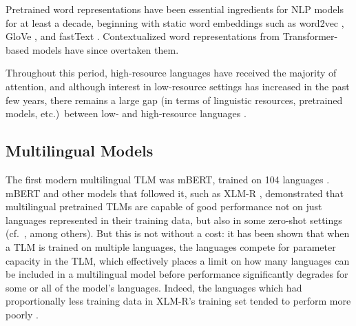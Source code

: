 \documentclass[11pt]{article}
\begin{document}
Pretrained word representations have been essential ingredients for NLP models for at least a decade, beginning with static word embeddings such as word2vec \citep{mikolov_distributed_2013,mikolov_efficient_2013}, GloVe \citep{pennington_glove_2014}, and fastText \citep{bojanowski_enriching_2017}.
Contextualized word representations \citep{mccann_learned_2018,peters_deep_2018,devlin_bert_2019} from Transformer-based \citep{vaswani_attention_2017} models have since overtaken them.


Throughout this period, high-resource languages have received the majority of attention, and although interest in low-resource settings has increased in the past few years, there remains a large gap (in terms of linguistic resources, pretrained models, etc.)\ between low- and high-resource languages \citep{joshi-etal-2020-state}.

\subsection{Multilingual Models} 
The first modern multilingual TLM was mBERT, trained on 104 languages \citep{devlin_bert_2019}.
mBERT and other models that followed it, such as XLM-R \citep{conneau_unsupervised_2020}, demonstrated that multilingual pretrained TLMs are capable of good performance not on just languages represented in their training data, but also in some zero-shot settings (cf.~\citealt{pires_how_2019,rogers_primer_2020-3}, among others).
But this is not without a cost: it has been shown \citep{conneau_unsupervised_2020} that when a TLM is trained on multiple languages, the languages compete for parameter capacity in the TLM, which effectively places a limit on how many languages can be included in a multilingual model before performance significantly degrades for some or all of the model's languages.
Indeed, the languages which had proportionally less training data in XLM-R's training set tended to perform more poorly \citep{wu_are_2020}.
\end{document}
